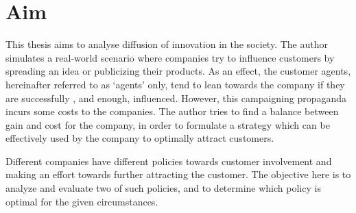 \section{Aim}
This thesis aims to analyse diffusion of innovation in the society. 
The author simulates a real-world scenario where companies try to influence customers by spreading an idea or publicizing their products. As an effect, the customer agents, hereinafter referred to as `agents' only, tend to lean towards the company if they are successfully , and enough, influenced.
However, this campaigning propaganda incurs some costs to the companies. The author tries to find a balance between gain and cost for the company, in order to formulate a strategy which can be effectively used by the company to optimally attract customers. 

Different companies have different policies towards customer involvement and making an effort towards further attracting the customer. The objective here is to analyze and evaluate two of such policies, and to determine which policy is optimal for the given circumstances.
